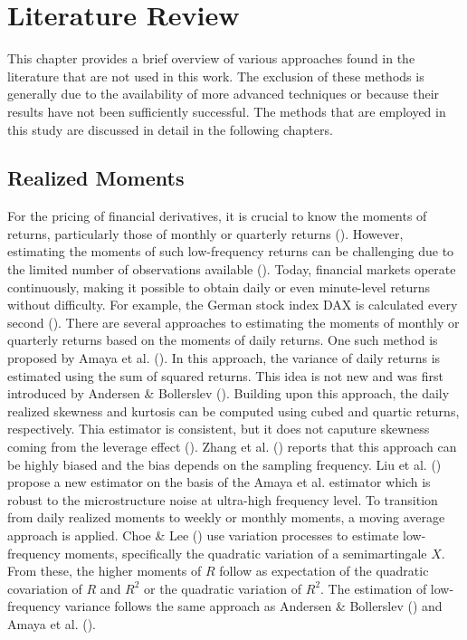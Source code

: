 \chapter{Literature Review}
\label{sec:literature}

This chapter provides a brief overview of various approaches found in the literature that are not used in this work. The exclusion of these methods is generally due to the availability of more advanced techniques or because their results have not been sufficiently successful. The methods that are employed in this study are discussed in detail in the following chapters.

\section{Realized Moments}
For the pricing of financial derivatives, it is crucial to know the moments of returns, particularly those of monthly or quarterly returns (\cite{barroRareDisastersAsset2006}). However, estimating the moments of such low-frequency returns can be challenging due to the limited number of observations available (\cite{neubergerSkewnessStockMarket2021}). Today, financial markets operate continuously, making it possible to obtain daily or even minute-level returns without difficulty. For example, the German stock index DAX is calculated every second (\cite{boersefrankfurtFunktioniertBoerse}). There are several approaches to estimating the moments of monthly or quarterly returns based on the moments of daily returns. One such method is proposed by Amaya et al. (\citeyear{amayaDoesRealizedSkewness2015}). In this approach, the variance of daily returns is estimated using the sum of squared returns. This idea is not new and was first introduced by Andersen \& Bollerslev (\citeyear{andersenAnsweringSkepticsYes1998}). Building upon this approach, the daily realized skewness and kurtosis can be computed using cubed and quartic returns, respectively. Thia estimator is consistent, but it does not caputure skewness coming from the leverage effect (\cite{galloDynamicTailRisk2024}). Zhang et al. (\citeyear{zhangTaleTwoTime2005}) reports that this approach can be highly biased and the bias depends on the sampling frequency. Liu et al. (\citeyear{liuRealizedSkewnessHigh2014}) propose a new estimator on the basis of the Amaya et al. estimator which is robust to the microstructure noise at ultra-high frequency level. To transition from daily realized moments to weekly or monthly moments, a moving average approach is applied. Choe \& Lee (\citeyear{choeHighMomentVariations2014}) use variation processes to estimate low-frequency moments, specifically the quadratic variation of a semimartingale $X$. From these, the higher moments of $R$ follow as expectation of the quadratic covariation of $R$ and $R^2$ or the quadratic variation of $R^2$. The estimation of low-frequency variance follows the same approach as Andersen \& Bollerslev (\citeyear{andersenAnsweringSkepticsYes1998}) and Amaya et al. (\citeyear{amayaDoesRealizedSkewness2015}). 

